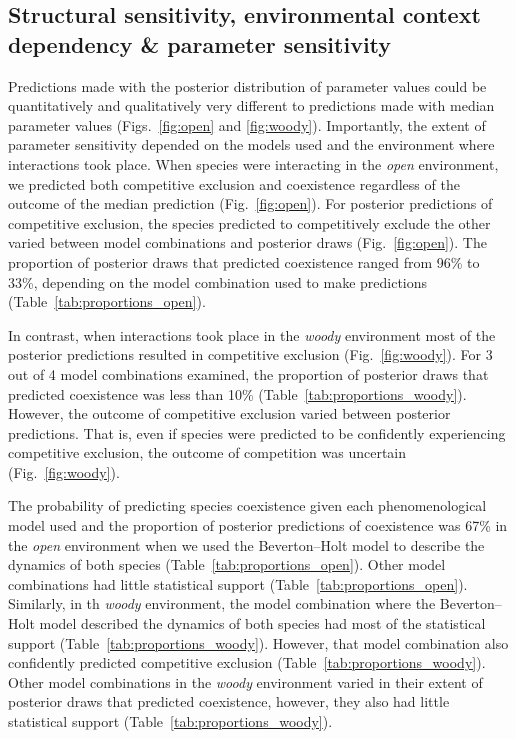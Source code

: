 \begin{refsection}
\subsection*{ Structural sensitivity, environmental context dependency \& parameter sensitivity }

Predictions made with the posterior distribution of parameter values could be quantitatively and qualitatively very different to predictions made with median parameter values (Figs.~\ref{fig:open} and \ref{fig:woody}). Importantly, the extent of parameter sensitivity depended on the models used and the environment where interactions took place. When species were interacting in the \textit{open} environment, we predicted both competitive exclusion and coexistence regardless of the outcome of the median prediction (Fig.~\ref{fig:open}). For posterior predictions of competitive exclusion, the species predicted to competitively exclude the other varied between model combinations and posterior draws (Fig.~\ref{fig:open}). The proportion of posterior draws that predicted coexistence ranged from 96\% to 33\%, depending on the model combination used to make predictions (Table~\ref{tab:proportions_open}).

In contrast, when interactions took place in the \textit{woody} environment  most of the posterior predictions resulted in competitive exclusion (Fig.~\ref{fig:woody}). For 3 out of 4 model combinations examined, the proportion of posterior draws that predicted coexistence was less than 10\% (Table~\ref{tab:proportions_woody}). However, the outcome of competitive exclusion varied  between  posterior predictions. That is, even if species were predicted to be confidently experiencing competitive exclusion, the outcome of competition was uncertain (Fig.~\ref{fig:woody}).

The probability of predicting species coexistence given each phenomenological model used and the proportion of posterior predictions of coexistence was 67\% in the \textit{open} environment when we used the Beverton--Holt model to describe the dynamics of both species (Table~\ref{tab:proportions_open}). Other model combinations had little statistical support  (Table~\ref{tab:proportions_open}). Similarly, in th \textit{woody} environment, the model combination where the Beverton--Holt model described the dynamics of both species had most of the statistical support (Table~\ref{tab:proportions_woody}). However, that model combination also confidently predicted competitive exclusion (Table~\ref{tab:proportions_woody}). Other model combinations in the \textit{woody} environment varied in their extent of posterior draws that predicted coexistence, however, they also had little statistical support (Table~\ref{tab:proportions_woody}).


\end{refsection}
